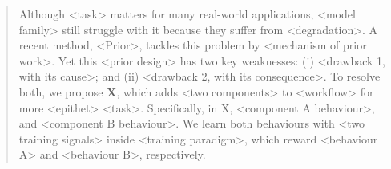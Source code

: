 \begin{abstract}
Although <task> matters for many real-world applications, <model family> still struggle with it because they suffer from <degradation>.
A recent method, <Prior>, tackles this problem by <mechanism of prior work>.
Yet this <prior design> has two key weaknesses:
(i) <drawback 1, with its cause>;
and (ii) <drawback 2, with its consequence>.
To resolve both, we propose \textbf{X}, which adds <two components> to <workflow> for more <epithet> <task>.
Specifically, in X, <component A behaviour>, and <component B behaviour>.
We learn both behaviours with <two training signals> inside <training paradigm>, which reward <behaviour A> and <behaviour B>, respectively.
\end{abstract}
